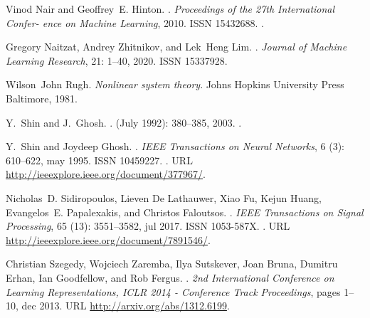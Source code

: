 \documentclass[twoside,11pt]{article}
\begin{document}
\begin{thebibliography}{36}
Vinod Nair and Geoffrey~E. Hinton.
.
\newblock \emph{Proceedings of the 27th International Confer- ence on Machine
  Learning}, 2010.
\newblock ISSN 15432688.
\newblock {}.

Gregory Naitzat, Andrey Zhitnikov, and Lek~Heng Lim.
.
\newblock \emph{Journal of Machine Learning Research}, 21: 1--40,
  2020.
\newblock ISSN 15337928.

Wilson~John Rugh.
\newblock \emph{Nonlinear system theory}.
\newblock Johns Hopkins University Press Baltimore, 1981.

Y.~Shin and J.~Ghosh.
.
\newblock {} (July 1992): 380--385, 2003.
\newblock {}.

Y.~Shin and Joydeep Ghosh.
.
\newblock \emph{IEEE Transactions on Neural Networks}, 6 (3):
  610--622, may 1995.
\newblock ISSN 10459227.
\newblock {}.
\newblock URL \url{http://ieeexplore.ieee.org/document/377967/}.

Nicholas~D. Sidiropoulos, Lieven {De Lathauwer}, Xiao Fu, Kejun Huang,
  Evangelos~E. Papalexakis, and Christos Faloutsos.
.
\newblock \emph{IEEE Transactions on Signal Processing}, 65
  (13): 3551--3582, jul 2017.
\newblock ISSN 1053-587X.
\newblock {}.
\newblock URL \url{http://ieeexplore.ieee.org/document/7891546/}.

Christian Szegedy, Wojciech Zaremba, Ilya Sutskever, Joan Bruna, Dumitru Erhan,
  Ian Goodfellow, and Rob Fergus.
.
\newblock \emph{2nd International Conference on Learning Representations, ICLR
  2014 - Conference Track Proceedings}, pages 1--10, dec 2013.
\newblock URL \url{http://arxiv.org/abs/1312.6199}.


\end{thebibliography}
\end{document}
